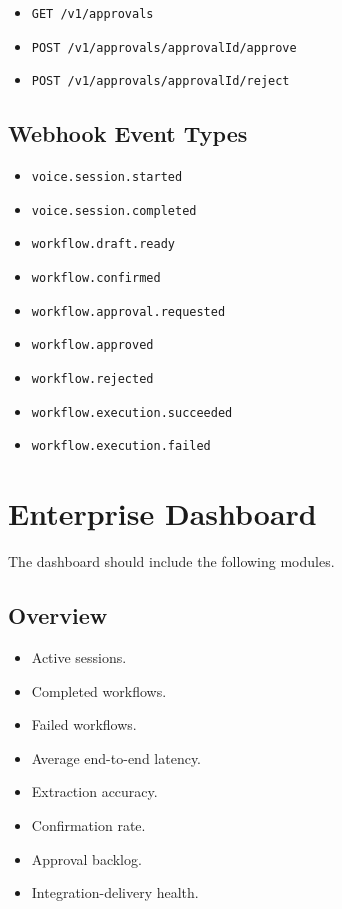 \documentclass[11pt,a4paper]{article}
\begin{document}
\begin{itemize}
\item \texttt{GET /v1/approvals}
\item \texttt{POST /v1/approvals/{approvalId}/approve}
\item \texttt{POST /v1/approvals/{approvalId}/reject}
\end{itemize}

\subsection{Webhook Event Types}

\begin{itemize}
\item \texttt{voice.session.started}
\item \texttt{voice.session.completed}
\item \texttt{workflow.draft.ready}
\item \texttt{workflow.confirmed}
\item \texttt{workflow.approval.requested}
\item \texttt{workflow.approved}
\item \texttt{workflow.rejected}
\item \texttt{workflow.execution.succeeded}
\item \texttt{workflow.execution.failed}
\end{itemize}

\section{Enterprise Dashboard}

The dashboard should include the following modules.

\subsection{Overview}

\begin{itemize}
\item Active sessions.
\item Completed workflows.
\item Failed workflows.
\item Average end-to-end latency.
\item Extraction accuracy.
\item Confirmation rate.
\item Approval backlog.
\item Integration-delivery health.
\end{itemize}
\end{document}
